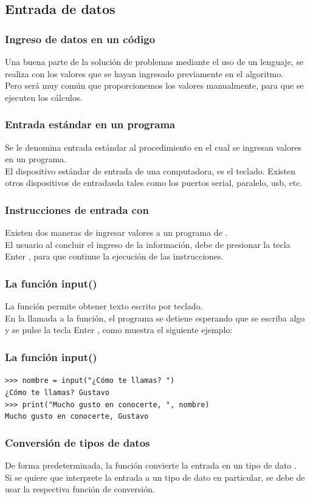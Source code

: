 \subsection{Entrada de datos}
\begin{frame}
\frametitle{Ingreso de datos en un código}
Una buena parte de la solución de problemas mediante el uso de un lenguaje, se realiza con los valores que se hayan ingresado previamente en el algoritmo.
\\
\bigskip
Pero será muy común que proporcionemos los valores manualmente, para que se ejecuten los cálculos.
\end{frame}
\begin{frame}\frametitle{Entrada estándar en un programa}
Se le denomina entrada estándar al procedimiento en el cual se ingresan valores en un programa.
\\
\bigskip
El dispositivo estándar de entrada de una computadora, es el teclado. Existen otros dispositivos de entradasda tales como los puertos serial, paralelo, usb, etc.
\end{frame}
\begin{frame}
\frametitle{Instrucciones de entrada con \python}
Existen dos maneras de ingresar valores a un programa de \python.
\\
\bigskip
El usuario al concluir el ingreso de la información, debe de presionar la tecla Enter \keys{\return}, para que continue la ejecución de las instrucciones.
\end{frame}
\begin{frame}[fragile]
\frametitle{La función input()}
La función  permite obtener texto escrito por teclado.
\\
\bigskip
En la llamada a la función, el programa se detiene esperando que se escriba algo y se pulse la tecla Enter \keys{\return}, como muestra el siguiente ejemplo:
\end{frame}
\begin{frame}[fragile]
\frametitle{La función input()}
\fontsize{12}{12}\selectfont
\begin{exampleblock}{}
	\verb|>>> nombre = input("¿Cómo te llamas? ")| \\
	\verb|¿Cómo te llamas? Gustavo| \\
	\verb|>>> print("Mucho gusto en conocerte, ", nombre)| \\
	\verb|Mucho gusto en conocerte, Gustavo|
\end{exampleblock}
\end{frame}
\begin{frame}
\frametitle{Conversión de tipos de datos}
De forma predeterminada, la función  convierte la entrada en un tipo de dato .
\\
\bigskip
Si se quiere que \python{} interprete la entrada a un tipo de dato en particular, se debe de usar la respectiva función de conversión.
\end{frame}
